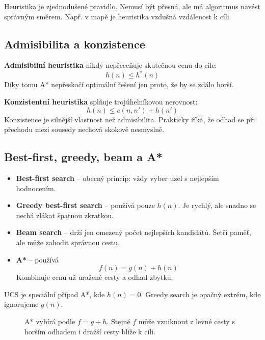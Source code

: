 Heuristika je zjednodušené pravidlo. Nemusí být přesná, ale má algoritmus
navést správným směrem. Např. v mapě je heuristika vzdušná vzdálenost k cíli.

\subsection*{Admisibilita a konzistence}
\textbf{Admisibilní heuristika} nikdy nepřeceňuje skutečnou cenu do cíle:
\begin{equation}
    h(n) \leq h^*(n)
\end{equation}
Díky tomu A* nepřeskočí optimální řešení jen proto, že by se zdálo horší.

\textbf{Konzistentní heuristika} splňuje trojúhelníkovou nerovnost:
\begin{equation}
    h(n) \leq c(n,n') + h(n')
\end{equation}
Konzistence je silnější vlastnost než admisibilita. Prakticky říká, že odhad se
při přechodu mezi sousedy nechová skokově nesmyslně.

\subsection*{Best-first, greedy, beam a A*}
\begin{itemize}
    \item \textbf{Best-first search} -- obecný princip: vždy vyber uzel s nejlepším hodnocením.
    \item \textbf{Greedy best-first search} -- používá pouze \(h(n)\). Je rychlý, ale snadno se nechá zlákat špatnou zkratkou.
    \item \textbf{Beam search} -- drží jen omezený počet nejlepších kandidátů. Šetří paměť, ale může zahodit správnou cestu.
    \item \textbf{A*} -- používá
          \begin{equation}
              f(n)=g(n)+h(n)
          \end{equation}
          Kombinuje cenu už uražené cesty a odhad zbytku.
\end{itemize}

UCS je speciální případ A*, kde \(h(n)=0\). Greedy search je opačný extrém, kde
ignorujeme \(g(n)\).

\begin{figure}[H]
    \centering
    \caption{A* vybírá podle \(f=g+h\). Stejné \(f\) může vzniknout z levné cesty s horším odhadem i dražší cesty blíže k cíli.}
\end{figure}

